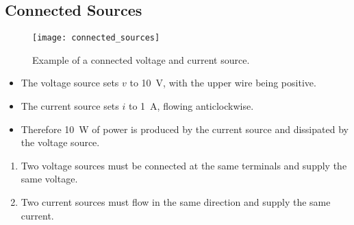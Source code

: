 \documentclass{article}
\begin{document}
\subsection{Connected Sources}
\begin{figure}[H]
    \centering
    \texttt{[image: connected\_sources]}
    \caption{Example of a connected voltage and current source.}
\end{figure}
\begin{itemize}
    \item The voltage source sets $v$ to \SI{10}{\volt}, with the upper wire being positive.
    \item The current source sets $i$ to \SI{1}{\ampere}, flowing anticlockwise.
    \item Therefore \SI{10}{\watt} of power is produced by the current source and dissipated by the voltage source.
\end{itemize}
\begin{enumerate}
    \item Two voltage sources must be connected at the same terminals and supply the same voltage.
    \item Two current sources must flow in the same direction and supply the same current.
\end{enumerate}
\end{document}
